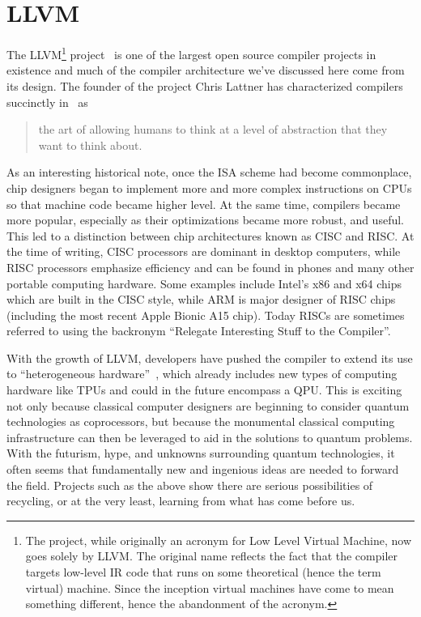 \section{LLVM}\label{sec:llvm}

The LLVM\footnote{The project, while originally an acronym for Low Level Virtual Machine, now goes solely by LLVM. The original name reflects the fact that the compiler targets low-level \ac{IR} code that runs on some theoretical (hence the term virtual) machine. Since the inception virtual machines have come to mean something different, hence the abandonment of the acronym.} project~\cite{llvm} is one of the largest open source compiler projects in existence and much of the compiler architecture we've discussed here come from its design.
The founder of the project Chris Lattner has characterized compilers succinctly in~\cite{lattnerquote} as
\begin{quote}
    the art of allowing humans to think at a level of abstraction that they want to think about.
\end{quote}

As an interesting historical note, once the \ac{ISA} scheme had become commonplace, chip designers began to implement more and more complex instructions on \acp{CPU} so that machine code became higher level.
At the same time, compilers became more popular, especially as their optimizations became more robust, and useful.
This led to a distinction between chip architectures known as \ac{CISC} and \ac{RISC}.
At the time of writing, \ac{CISC} processors are dominant in desktop computers, while \ac{RISC} processors emphasize efficiency and can be found in phones and many other portable computing hardware.
Some examples include Intel's x86 and x64 chips which are built in the \ac{CISC} style, while ARM is major designer of \ac{RISC} chips (including the most recent Apple Bionic A15 chip). %
Today \acp{RISC} are sometimes referred to using the backronym ``Relegate Interesting Stuff to the Compiler''.

With the growth of LLVM, developers have pushed the compiler to extend its use to ``heterogeneous hardware''~\cite{mlir}, which already includes new types of computing hardware like \acp{TPU} and could in the future encompass a \ac{QPU}.
This is exciting not only because classical computer designers are beginning to consider quantum technologies as coprocessors, but because the monumental classical computing infrastructure can then be leveraged to aid in the solutions to quantum problems.
With the futurism, hype, and unknowns surrounding quantum technologies, it often seems that fundamentally new and ingenious ideas are needed to forward the field.
Projects such as the above show there are serious possibilities of recycling, or at the very least, learning from what has come before us.
